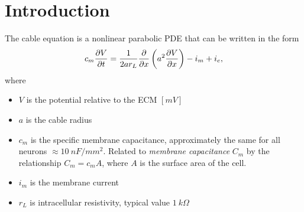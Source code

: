 \section*{Introduction}

The cable equation is a nonlinear parabolic PDE that can be written in the form
\begin{equation}
    c_m \frac{\partial{V}}{\partial{t}} = \frac{1}{2ar_{L}} \frac{\partial{}}{\partial{x}} \left( a^2 \frac{\partial{V}}{\partial{x}} \right) - i_m + i_e,
\end{equation}
where
\begin{itemize}
    \item $V$ is the potential relative to the ECM $[mV]$
    \item $a$ is the cable radius 
    \item $c_m$ is the {specific membrane capacitance}, approximately the same for all neurons $\approx 10~nF/mm^2$. Related to \emph{membrane capacitance} $C_m$ by the relationship $C_m=c_{m}A$, where $A$ is the surface area of the cell.
    \item $i_m$ is the membrane current 
    \item $r_L$ is intracellular resistivity, typical value $1~k\Omega$
\end{itemize}
